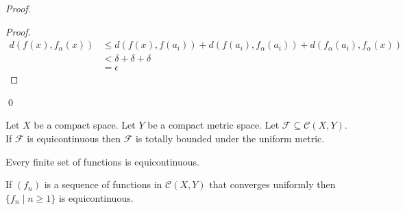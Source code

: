 \begin{proof}
    \pf
    \begin{proof}
        \pf
        \begin{align*}
            d(f(x),f_\alpha(x)) & \leq d(f(x),f(a_i)) + d(f(a_i),f_\alpha(a_i)) + d(f_\alpha(a_i),f_\alpha(x)) \\
            & < \delta + \delta + \delta \\
            & = \epsilon
        \end{align*}
    \end{proof}
    \qed
\end{proof}

\begin{corollary}
    \label{corollary:equicontinuous_totally_bounded}
    Let $X$ be a compact space. Let $Y$ be a compact metric space. Let $\mathcal{F} \subseteq \mathcal{C}(X,Y)$. If $\mathcal{F}$
    is equicontinuous then $\mathcal{F}$ is totally bounded under the uniform metric.
\end{corollary}

\begin{proposition}
    Every finite set of functions is equicontinuous.
\end{proposition}

\begin{proposition}
    If $(f_n)$ is a sequence of functions in $\mathcal{C}(X,Y)$ that converges uniformly then $\{ f_n \mid n \geq 1 \}$
    is equicontinuous.
\end{proposition}

